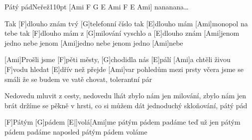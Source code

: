 \begin{song}{Pátý pád}{Neřež}{110pt}
[Ami F G E Ami F E Ami]{}
\chorus%
[F G E Ami]nananana\dots

\verse{*}%
Tak [F]dlouho znám tvý [G]telefonní číslo
tak [E]dlouho mám [Ami]monopol na tebe
tak [F]dlouho mám z [G]milování vyschlo
a [E]dlouho znám [Ami]jenom jedno nebe
jenom [Ami]jedno nebe jenom jedno [Ami]nebe
\repchor

%
[Ami]Prošli jsme [F]pěti městy, [G]chodidla nás [E]pálí
[Ami]a chtěli živou [F]vodu hledat [E]dřív než přejde [Ami]var
pohledům mezi prsty včera jsme se smáli
že se budem ve vatě chovat, tolerantní pár
\repchor

%
Nedovedu mluvit z cesty, nedovedu lhát
zbylo nám jen milování, zbylo nám jen brát
držíme se pěkně v hrsti, co si můžem dát
jednoduchý skloňování, pátý pád

\verse{*}%
[F]Pátým [G]pádem [E|]{}volá[Ami]me
pátým pádem padáme
teď už jen pátým pádem padáme
naposled pátým pádem voláme
\repchor
\end{song}
